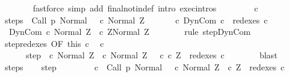 \begin{isabellebody}
\ \ \ \ \ \ \isamarkupfalse%
\ {\isacharparenleft}fastforce\ simp\ add{\isacharcolon}\ final{\isacharunderscore}notin{\isacharunderscore}def\ intro{\isacharcolon}\ exec{\isachardot}intros{\isacharparenright}\isanewline
\ \ \isamarkupfalse%
\isanewline
\ \ \ \ \isamarkupfalse%
\ c{\isacharprime}\isanewline
\ \ \ \ \isamarkupfalse%
\ steps{\isacharcolon}\ {\isachardoublequoteopen}{\isasymGamma}{\isasymturnstile}\ {\isacharparenleft}Call\ p{\isacharcomma}\ Normal\ {\isasymsigma}{\isacharparenright}\ {\isasymrightarrow}\isactrlsup {\isacharplus}\ {\isacharparenleft}c{\isacharprime}{\isacharcomma}\ Normal\ Z{\isacharparenright}{\isachardoublequoteclose}\ \isanewline
\ \ \ \ \isamarkupfalse%
\ c{\isacharprime}{\isacharcolon}\ {\isachardoublequoteopen}DynCom\ c\ {\isasymin}\ redexes\ c{\isacharprime}{\isachardoublequoteclose}\isanewline
\ \ \ \ \isamarkupfalse%
\ {\isachardoublequoteopen}{\isasymGamma}{\isasymturnstile}\ {\isacharparenleft}DynCom\ c{\isacharcomma}\ Normal\ Z{\isacharparenright}\ {\isasymrightarrow}\ {\isacharparenleft}c\ Z{\isacharcomma}Normal\ Z{\isacharparenright}{\isachardoublequoteclose}\isanewline
\ \ \ \ \ \ \isamarkupfalse%
\ {\isacharparenleft}rule\ step{\isachardot}DynCom{\isacharparenright}\isanewline
\ \ \ \ \isamarkupfalse%
\ step{\isacharunderscore}redexes\ {\isacharbrackleft}OF\ this\ c{\isacharprime}{\isacharbrackright}\ \isamarkupfalse%
\ c{\isacharprime}{\isacharprime}\ \isanewline
\ \ \ \ \ \ step{\isacharcolon}\ {\isachardoublequoteopen}{\isasymGamma}{\isasymturnstile}\ {\isacharparenleft}c{\isacharprime}{\isacharcomma}\ Normal\ Z{\isacharparenright}\ {\isasymrightarrow}\ {\isacharparenleft}c{\isacharprime}{\isacharprime}{\isacharcomma}\ Normal\ Z{\isacharparenright}{\isachardoublequoteclose}\ \ \ c{\isacharprime}{\isacharprime}{\isacharcolon}\ {\isachardoublequoteopen}c\ Z\ {\isasymin}\ redexes\ c{\isacharprime}{\isacharprime}{\isachardoublequoteclose}\isanewline
\ \ \ \ \ \ \isamarkupfalse%
\ blast\isanewline
\ \ \ \ \isamarkupfalse%
\ steps\ \isamarkupfalse%
\ \isamarkupfalse%
\ step\ \isanewline
\ \ \ \ \isamarkupfalse%
\ \isamarkupfalse%
\ {\isachardoublequoteopen}{\isasymexists}c{\isacharprime}{\isachardot}\ {\isasymGamma}{\isasymturnstile}\ {\isacharparenleft}Call\ p{\isacharcomma}\ Normal\ {\isasymsigma}{\isacharparenright}\ {\isasymrightarrow}\isactrlsup {\isacharplus}\ {\isacharparenleft}c{\isacharprime}{\isacharcomma}\ Normal\ Z{\isacharparenright}\ {\isasymand}\ c\ Z\ {\isasymin}\ redexes\ c{\isacharprime}{\isachardoublequoteclose}\isanewline

\end{isabellebody}
